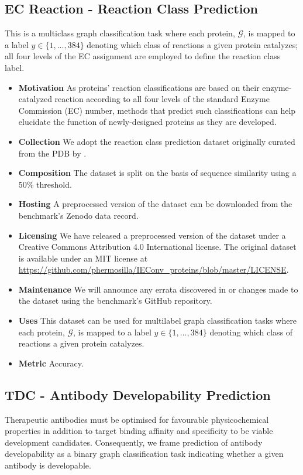 \subsection{EC Reaction - Reaction Class Prediction}
This is a multiclass graph classification task where each protein, $\mathcal{G}$, is mapped to a label $y \in {\{1, ..., 384\}}$ denoting which class of reactions a given protein catalyzes; all four levels of the EC assignment are employed to define the reaction class label. 
\begin{itemize}
    \item \textbf{Motivation} As proteins' reaction classifications are based on their enzyme-catalyzed reaction according to all four levels of the standard Enzyme Commission (EC) number, methods that predict such classifications can help elucidate the function of newly-designed proteins as they are developed.
    \item \textbf{Collection} We adopt the reaction class prediction dataset originally curated from the PDB by \citet{hermosilla2020intrinsic}.
    \item \textbf{Composition} The dataset is split on the basis of sequence similarity using a 50\% threshold.
    \item \textbf{Hosting} A preprocessed version of the dataset can be downloaded from the benchmark's Zenodo data record.%
    \item \textbf{Licensing} We have released a preprocessed version of the dataset under a Creative Commons Attribution 4.0 International license. The original dataset is available under an MIT license at \url{https://github.com/phermosilla/IEConv_proteins/blob/master/LICENSE}.
    \item \textbf{Maintenance} We will announce any errata discovered in or changes made to the dataset using the benchmark's GitHub repository.%
    \item \textbf{Uses} This dataset can be used for multilabel graph classification tasks where each protein, $\mathcal{G}$, is mapped to a label $y \in {\{1, ..., 384\}}$ denoting which class of reactions a given protein catalyzes.
    \item \textbf{Metric} Accuracy.
\end{itemize}
\subsection{TDC - Antibody Developability Prediction}
Therapeutic antibodies must be optimised for favourable physicochemical properties in addition to target binding affinity and specificity to be viable development candidates. Consequently, we frame prediction of antibody developability as a binary graph classification task indicating whether a given antibody is developable.

